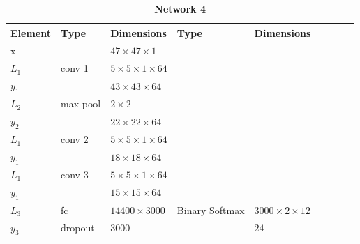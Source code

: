     \begin{table}[h!]
    \centering
    \caption*{{\bf \large Network 4}}
    {\footnotesize
    \begin{tabular}{|lllllllll|}
    \hline
    \multicolumn{1}{|l|}{Element} & Type     & \multicolumn{1}{l|}{Dimensions}                     & Type     & \multicolumn{1}{l|}{Dimensions}  \\ \hline
    \multicolumn{1}{|l|}{x}       &          & \multicolumn{1}{l|}{$47\times47\times1$}            &          & \multicolumn{1}{l|}{}        \\ \hline

    \multicolumn{1}{|l|}{$L_1$}   & conv 1   & \multicolumn{1}{l|}{$5\times 5\times1\times 64$}    &          & \multicolumn{1}{l|}{}\\
    \multicolumn{1}{|l|}{$y_1$}   &          & \multicolumn{1}{l|}{$43\times43\times64$}           &          & \multicolumn{1}{l|}{}        \\ \hline

    \multicolumn{1}{|l|}{$L_2$}   & max pool & \multicolumn{1}{l|}{$2\times 2$}                    &          & \multicolumn{1}{l|}{}        \\
    \multicolumn{1}{|l|}{$y_2$}   &          & \multicolumn{1}{l|}{$22\times22\times 64$}          &          & \multicolumn{1}{l|}{}        \\ \hline

    \multicolumn{1}{|l|}{$L_1$}   & conv 2   & \multicolumn{1}{l|}{$5\times 5\times1\times 64$}    &          & \multicolumn{1}{l|}{}\\
    \multicolumn{1}{|l|}{$y_1$}   &          & \multicolumn{1}{l|}{$18\times18\times64$}           &          & \multicolumn{1}{l|}{}        \\ \hline

    \multicolumn{1}{|l|}{$L_1$}   & conv 3   & \multicolumn{1}{l|}{$5\times 5\times1\times 64$}    &          & \multicolumn{1}{l|}{}\\
    \multicolumn{1}{|l|}{$y_1$}   &          & \multicolumn{1}{l|}{$15\times15\times64$}           &          & \multicolumn{1}{l|}{}        \\ \hline

    \multicolumn{1}{|l|}{$L_3$}   & fc       & \multicolumn{1}{l|}{$14400\times3000$}              & Binary Softmax & \multicolumn{1}{l|}{$3000\times2\times12$}        \\
    \multicolumn{1}{|l|}{$y_3$}   & dropout  & \multicolumn{1}{l|}{$3000$}                         &          & \multicolumn{1}{l|}{$24$}        \\ \hline


\end{tabular}}
\end{table}
